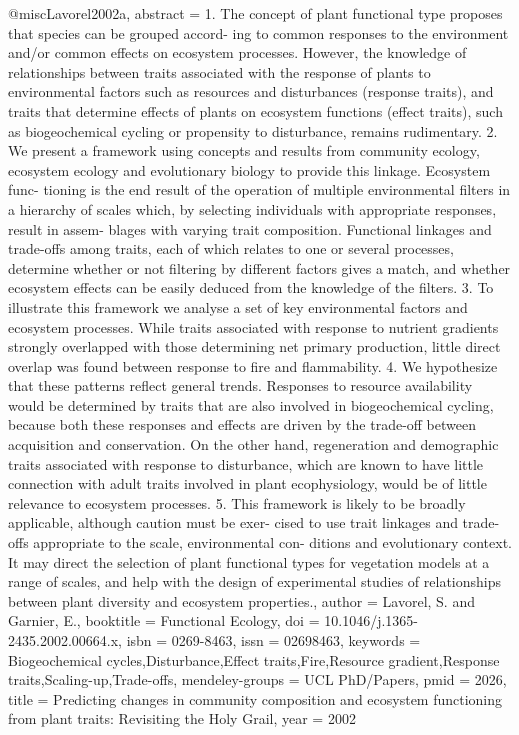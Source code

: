 {{@misc{Lavorel2002a,
abstract = {1. The concept of plant functional type proposes that species can be grouped accord- ing to common responses to the environment and/or common effects on ecosystem processes. However, the knowledge of relationships between traits associated with the response of plants to environmental factors such as resources and disturbances (response traits), and traits that determine effects of plants on ecosystem functions (effect traits), such as biogeochemical cycling or propensity to disturbance, remains rudimentary. 2. We present a framework using concepts and results from community ecology, ecosystem ecology and evolutionary biology to provide this linkage. Ecosystem func- tioning is the end result of the operation of multiple environmental filters in a hierarchy of scales which, by selecting individuals with appropriate responses, result in assem- blages with varying trait composition. Functional linkages and trade-offs among traits, each of which relates to one or several processes, determine whether or not filtering by different factors gives a match, and whether ecosystem effects can be easily deduced from the knowledge of the filters. 3. To illustrate this framework we analyse a set of key environmental factors and ecosystem processes. While traits associated with response to nutrient gradients strongly overlapped with those determining net primary production, little direct overlap was found between response to fire and flammability. 4. We hypothesize that these patterns reflect general trends. Responses to resource availability would be determined by traits that are also involved in biogeochemical cycling, because both these responses and effects are driven by the trade-off between acquisition and conservation. On the other hand, regeneration and demographic traits associated with response to disturbance, which are known to have little connection with adult traits involved in plant ecophysiology, would be of little relevance to ecosystem processes. 5. This framework is likely to be broadly applicable, although caution must be exer- cised to use trait linkages and trade-offs appropriate to the scale, environmental con- ditions and evolutionary context. It may direct the selection of plant functional types for vegetation models at a range of scales, and help with the design of experimental studies of relationships between plant diversity and ecosystem properties.},
author = {Lavorel, S. and Garnier, E.},
booktitle = {Functional Ecology},
doi = {10.1046/j.1365-2435.2002.00664.x},
isbn = {0269-8463},
issn = {02698463},
keywords = {Biogeochemical cycles,Disturbance,Effect traits,Fire,Resource gradient,Response traits,Scaling-up,Trade-offs},
mendeley-groups = {UCL PhD/Papers},
pmid = {2026},
title = {{Predicting changes in community composition and ecosystem functioning from plant traits: Revisiting the Holy Grail}},
year = {2002}
}

}}
